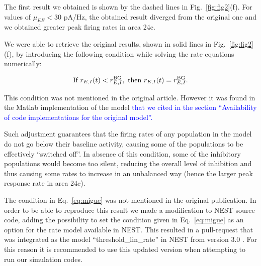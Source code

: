 The first result we obtained is shown by the dashed lines in Fig.~\ref{fig:fig2}(f). For values of $\mu_{EE} < 30$ pA/Hz, the obtained result diverged from the original one and we obtained greater peak firing rates in area 24c.

We were able to retrieve the original results, shown in solid lines in Fig.~\ref{fig:fig2}(f), by introducing the following condition while solving the rate equations numerically:

\begin{equation}
    \text{If } r_{E,I}(t) < r_{E,I}^{\rm BG}, \text{ then } r_{E,I}(t) = r_{E,I}^{\rm BG}.
    \label{eq:migue}
\end{equation}

This condition was not mentioned in the original article. However it was found in the Matlab implementation of the model \textcolor{blue}{that we cited in the section ``Availability of code implementations for the original model''.}


Such adjustment guarantees that the firing rates of any population in the model do not go below their baseline activity, causing some of the populations to be effectively ``switched off''. In absence of this condition, some of the inhibitory populations would become too silent, reducing the overall level of inhibition and thus causing some rates to increase in an unbalanced way (hence the larger peak response rate in area 24c). 

The condition in Eq.~\ref{eq:migue} was not mentioned in the original publication. In order to be able to reproduce this result we made a modification to NEST source code, adding the possibility to set the condition given in Eq.~\ref{eq:migue} as an option for the rate model available in NEST. This resulted in a pull-request that was integrated as the model ``threshold\_lin\_rate'' in NEST from version 3.0 \cite{hahne_jan_2021_4739103}. For this reason it is recommended to use this updated version when attempting to run our simulation codes.


